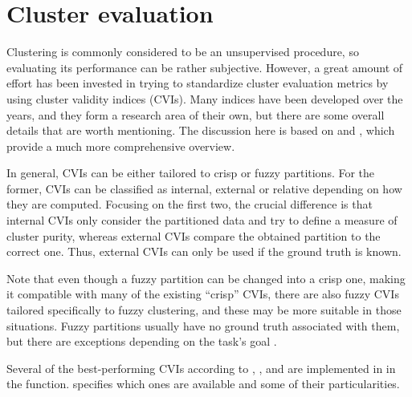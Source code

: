 \section{Cluster evaluation}
\label{sec:evaluation}

Clustering is commonly considered to be an unsupervised procedure,
so evaluating its performance can be rather subjective.
However, a great amount of effort has been invested in trying to standardize cluster evaluation metrics by using cluster validity indices (CVIs).
Many indices have been developed over the years,
and they form a research area of their own,
but there are some overall details that are worth mentioning.
The discussion here is based on \citet{arbelaitz2013} and \citet{wang2007},
which provide a much more comprehensive overview.

In general, CVIs can be either tailored to crisp or fuzzy partitions.
For the former,
CVIs can be classified as internal, external or relative depending on how they are computed.
Focusing on the first two,
the crucial difference is that internal CVIs only consider the partitioned data and try to define a measure of cluster purity,
whereas external CVIs compare the obtained partition to the correct one.
Thus, external CVIs can only be used if the ground truth is known.

Note that even though a fuzzy partition can be changed into a crisp one,
making it compatible with many of the existing ``crisp'' CVIs,
there are also fuzzy CVIs tailored specifically to fuzzy clustering,
and these may be more suitable in those situations.
Fuzzy partitions usually have no ground truth associated with them,
but there are exceptions depending on the task's goal \citep{lei2017}.

Several of the best-performing CVIs according to \citet{wang2007}, \citet{arbelaitz2013}, and \cite{lei2017} are implemented in \dtwclust{} in the  function.
 specifies which ones are available and some of their particularities.

